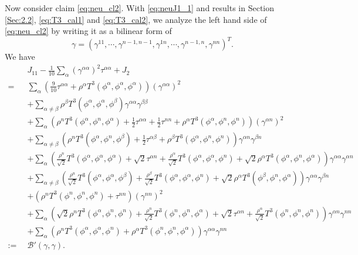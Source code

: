 \documentclass[12pt]{article}
\numberwithin{equation}{section}
\theoremstyle{plain}
\theoremstyle{definition}
\theoremstyle{remark}
\begin{document}
Now consider claim \eqref{eq:neu_cl2}. With \eqref{eq:neuJ1_1} and results in Section \ref{Sec:2.2}, \eqref{eq:T3_cal1} and \eqref{eq:T3_cal2}, we analyze the left hand side of \eqref{eq:neu_cl2} by writing it as a bilinear form of 
\[\gamma = \left(\gamma^{11}, \cdots, \gamma^{n-1,n-1}, \gamma^{1n}, \cdots, \gamma^{n-1,n}, \gamma^{nn}  \right)^T.\] 
We have
\begin{equation}
\begin{split}
    \,\,\, & J_{11} - \frac{1}{10}\sum_{\alpha} (\gamma^{\alpha \alpha})^2 \tau^{\alpha \alpha} +J_2 \\
  = \,\,\,&  \sum_{\alpha} \left( \frac{9}{10}  \tau^{\alpha \alpha} + \rho^{\alpha} T^3 (\phi^{\alpha}, \phi^{\alpha}, \phi^{\alpha}) \right)   (\gamma^{\alpha \alpha})^2  \\
  & + \sum_{\alpha \neq \beta}  \rho^{\beta} T^3 (\phi^{\alpha}, \phi^{\alpha}, \phi^{\beta})    \gamma^{\alpha \alpha} \gamma^{\beta \beta} \\
  & + \sum_{\alpha}    \left( \rho^n T^3 (\phi^{\alpha}, \phi^{n}, \phi^{\alpha}) + \frac{1}{2} \tau^{\alpha \alpha} +  \frac{1}{2} \tau^{nn} + \rho^{\alpha} T^3 (\phi^{\alpha}, \phi^n, \phi^n)  \right) (\gamma^{\alpha n})^2 \\
  & + \sum_{\alpha \neq \beta}  \left( \rho^n  T^3 (\phi^{\alpha}, \phi^{n}, \phi^{\beta}) + \frac{1}{2}  \tau^{\alpha \beta} + \rho^{\beta} T^3 (\phi^{\alpha}, \phi^n, \phi^n)   \right)  \gamma^{\alpha n} \gamma^{\beta n} \\
  & + \sum_{\alpha}  \left( \frac{\rho^n}{\sqrt{2}}  T^3 (\phi^{\alpha}, \phi^{\alpha}, \phi^{\alpha}) + \sqrt{2}  \tau^{\alpha n}  + \frac{\rho^{\alpha}}{\sqrt{2}} T^3 (\phi^{\alpha}, \phi^{\alpha}, \phi^{n}) + \sqrt{2} \rho^{\alpha}  T^3 (\phi^{\alpha}, \phi^{n}, \phi^{\alpha}) \right) \gamma^{\alpha \alpha} \gamma^{\alpha n} \\
  & + \sum_{\alpha \neq \beta}  \left( \frac{\rho^n}{\sqrt{2}}  T^3 (\phi^{\alpha}, \phi^{\alpha}, \phi^{\beta}) + \frac{\rho^{\beta}}{\sqrt{2}} T^3 (\phi^{\alpha}, \phi^{\alpha}, \phi^{n}) +  \sqrt{2} \rho^{\alpha}  T^3 (\phi^{\beta}, \phi^{n}, \phi^{\alpha})  \right) \gamma^{\alpha \alpha} \gamma^{\beta n} \\
  & + \left( \rho^n  T^3 (\phi^{n}, \phi^{n}, \phi^{n})  +   \tau^{n n}  \right)  (\gamma^{n n})^2 \\
  & + \sum_{\alpha} \left( \sqrt{2}  \rho^n  T^3 (\phi^{\alpha}, \phi^n, \phi^n) + \frac{\rho^n}{\sqrt{2}} T^3 (\phi^{n}, \phi^{n}, \phi^{\alpha}) + \sqrt{2} \tau^{\alpha n}  +  \frac{\rho^{\alpha}}{\sqrt{2}} T^3 (\phi^{n}, \phi^{n}, \phi^{n})  \right) \gamma^{\alpha n} \gamma^{n n}  \\
  & + \sum_{\alpha} \left(  \rho^n  T^3 (\phi^{\alpha}, \phi^{\alpha}, \phi^{n}) + \rho^{\alpha} T^3 (\phi^{n}, \phi^{n}, \phi^{\alpha})   \right) \gamma^{\alpha \alpha} \gamma^{n n} \\
  :=\,\,\, & \mathcal{B}'(\gamma, \gamma).
\end{split}
\end{equation}
\end{document}
